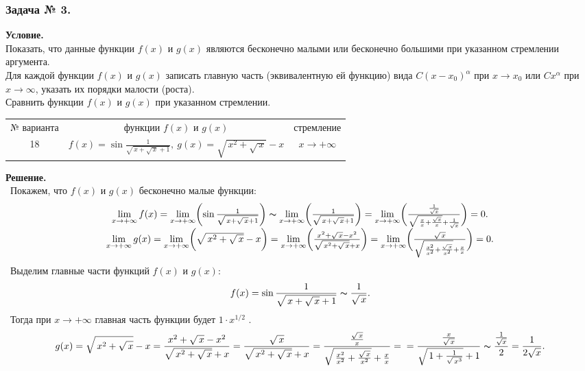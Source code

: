 \documentclass[12pt]{article}
\begin{document}
\subsubsection*{\center Задача № 3.}
{\bf Условие.~}\\
 Показать, что данные функции
$f(x)$ и $g(x)$ являются бесконечно малыми или бесконечно большими
при указанном стремлении аргумента. \\
 Для каждой функции $f(x)$ и $g(x)$ записать главную часть
(эквивалентную ей функцию)  вида $C(x-x_0)^{\alpha}$ при $x\rightarrow x_0$ или $Cx^{\alpha}$
при $x\rightarrow\infty$, указать их порядки малости (роста). \\
 Сравнить функции $f(x)$ и $g(x)$ при указанном стремлении.
\begin{center}
	\begin{tabular}{|c|c|c|}
		\hline
		№ варианта & функции $f(x)$ и $g(x)$ & стремление \\[6pt]
		18 & $f(x) = \sin{\frac{1}{\sqrt{\,x+\sqrt{\,x}+1}}},~g(x)=\sqrt{\,x^2+\sqrt{\,x}}-x$ & $x\rightarrow+\infty$ \\
		\hline
	\end{tabular}
\end{center}
{\bf Решение.~}\\
~Покажем, что $f(x)$ и $g(x)$ бесконечно малые функции:
$$
\begin{array}{cc}
\lim\limits_{x\rightarrow+\infty}f(x) = \lim\limits_{x\rightarrow+\infty}\biggl(\sin{\frac{1}{\sqrt{\,x+\sqrt{\,x}+1}}}\biggr) \thicksim \lim\limits_{x\rightarrow+\infty}\biggl(\frac{1}{\sqrt{\,x+\sqrt{\,x}+1}}\biggr) = \lim\limits_{x\rightarrow+\infty}\biggl(\frac{\frac{1}{\sqrt{x}}}{\sqrt{\,\frac{x}{x}+\frac{\sqrt{x}}{x}}+\frac{1}{\sqrt{x}}}\biggr) = 0.
\\
\lim\limits_{x\rightarrow+\infty}g(x) = \lim\limits_{x\rightarrow+\infty}\biggl(\sqrt{\,x^2+\sqrt{\,x}}-x\biggr) = 
\lim\limits_{x\rightarrow+\infty}\biggl(\frac{x^2+\sqrt{\,x}-x^2}{\sqrt{\,x^2+\sqrt{\,x}}+x}\biggr) = 
\lim\limits_{x\rightarrow+\infty}\biggl(\frac{\sqrt{\,x}}{\sqrt{\,\frac{x^2}{x^2}+\frac{\sqrt{\,x}}{x^2}}+\frac{x}{x}}\biggr) = 0.
\end{array}
$$
~Выделим главные части функций $f(x)$ и $g(x)$:
$$ 
f(x) = \sin{\frac{1}{\sqrt{\,x+\sqrt{\,x}+1}}} \thicksim \frac{1}{\sqrt{\,x}} .
$$
\text{\bf}~Тогда при $x\rightarrow+\infty$ главная часть функции будет $1\cdot x^{1/2}$ .
$$ 
g(x) = \sqrt{\,x^2+\sqrt{\,x}}-x = \dfrac{x^2+\sqrt{\,x}-x^2}{\sqrt{\,x^2+\sqrt{\,x}}+x} = \dfrac{\sqrt{\,x}}{\sqrt{\,x^2+\sqrt{\,x}}+x} = \dfrac{\frac{\sqrt{\,x}}{x}}{\sqrt{\,\frac{x^2}{x^2}+\frac{\sqrt{\,x}}{x^2}}+\frac{x}{x}} = \\
= \dfrac{\frac{x}{\sqrt{\,x}}}{\sqrt{\,1+\frac{1}{\sqrt{\,x^3}}}+1} \thicksim \dfrac{\frac{1}{\sqrt{x}}}{2} = \dfrac{1}{2\sqrt{x}} . \\
$$
\end{document}
